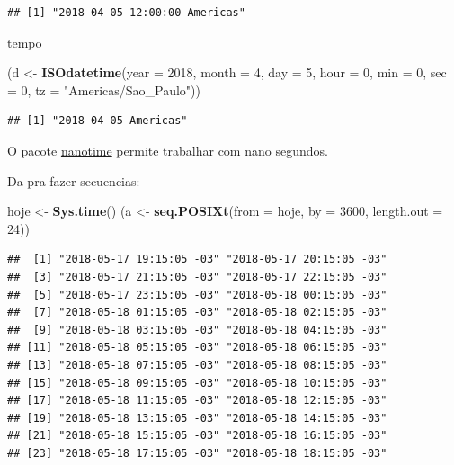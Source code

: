 \documentclass[]{book}
\newenvironment{Shaded}{\begin{snugshade}}{\end{snugshade}}
\newcommand{\KeywordTok}[1]{\textcolor[rgb]{0.13,0.29,0.53}{\textbf{#1}}}
\newcommand{\DataTypeTok}[1]{\textcolor[rgb]{0.13,0.29,0.53}{#1}}
\newcommand{\DecValTok}[1]{\textcolor[rgb]{0.00,0.00,0.81}{#1}}
\newcommand{\StringTok}[1]{\textcolor[rgb]{0.31,0.60,0.02}{#1}}
\newcommand{\NormalTok}[1]{#1}
\begin{document}
\begin{verbatim}
## [1] "2018-04-05 12:00:00 Americas"
\end{verbatim}

tempo

\begin{Shaded}
\begin{Highlighting}[]
\NormalTok{(d <-}\StringTok{ }\KeywordTok{ISOdatetime}\NormalTok{(}\DataTypeTok{year =} \DecValTok{2018}\NormalTok{, }\DataTypeTok{month =} \DecValTok{4}\NormalTok{, }\DataTypeTok{day =} \DecValTok{5}\NormalTok{, }\DataTypeTok{hour =} \DecValTok{0}\NormalTok{, }\DataTypeTok{min =} \DecValTok{0}\NormalTok{, }\DataTypeTok{sec =} \DecValTok{0}\NormalTok{,}
                  \DataTypeTok{tz =} \StringTok{"Americas/Sao_Paulo"}\NormalTok{))}
\end{Highlighting}
\end{Shaded}

\begin{verbatim}
## [1] "2018-04-05 Americas"
\end{verbatim}

O pacote \href{https://github.com/eddelbuettel/nanotime}{nanotime}
permite trabalhar com nano segundos.

Da pra fazer secuencias:

\begin{Shaded}
\begin{Highlighting}[]
\NormalTok{hoje <-}\StringTok{ }\KeywordTok{Sys.time}\NormalTok{()}
\NormalTok{(a <-}\StringTok{ }\KeywordTok{seq.POSIXt}\NormalTok{(}\DataTypeTok{from =}\NormalTok{ hoje, }\DataTypeTok{by =} \DecValTok{3600}\NormalTok{, }\DataTypeTok{length.out =} \DecValTok{24}\NormalTok{))}
\end{Highlighting}
\end{Shaded}

\begin{verbatim}
##  [1] "2018-05-17 19:15:05 -03" "2018-05-17 20:15:05 -03"
##  [3] "2018-05-17 21:15:05 -03" "2018-05-17 22:15:05 -03"
##  [5] "2018-05-17 23:15:05 -03" "2018-05-18 00:15:05 -03"
##  [7] "2018-05-18 01:15:05 -03" "2018-05-18 02:15:05 -03"
##  [9] "2018-05-18 03:15:05 -03" "2018-05-18 04:15:05 -03"
## [11] "2018-05-18 05:15:05 -03" "2018-05-18 06:15:05 -03"
## [13] "2018-05-18 07:15:05 -03" "2018-05-18 08:15:05 -03"
## [15] "2018-05-18 09:15:05 -03" "2018-05-18 10:15:05 -03"
## [17] "2018-05-18 11:15:05 -03" "2018-05-18 12:15:05 -03"
## [19] "2018-05-18 13:15:05 -03" "2018-05-18 14:15:05 -03"
## [21] "2018-05-18 15:15:05 -03" "2018-05-18 16:15:05 -03"
## [23] "2018-05-18 17:15:05 -03" "2018-05-18 18:15:05 -03"
\end{verbatim}
\end{document}
